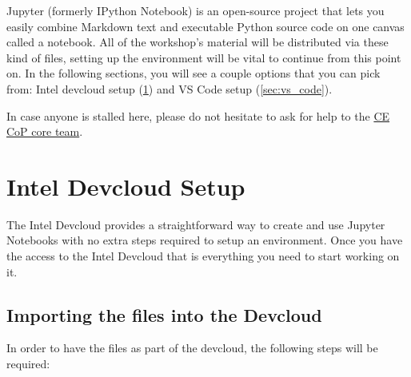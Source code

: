 \documentclass{assignment}
\begin{document}






Jupyter (formerly IPython Notebook) is an open-source project that lets you easily combine Markdown text and executable Python source code on one canvas called a notebook. All of the workshop's material will be distributed via these kind of files, setting up the environment will be vital to continue from this point on. In the following sections, you will see a couple options that you can pick from: Intel devcloud setup (\ref{sec:dev_cloud}) and VS Code setup (\ref{sec:vs_code}).

In case anyone is stalled here, please do not hesitate to ask for help to the \href{mailto:computer.eng.cop.core.team@intel.com}{CE CoP core team}. 

\section{Intel Devcloud Setup}
\label{sec:dev_cloud}

The Intel Devcloud provides a straightforward way to create and use Jupyter Notebooks with no extra steps required to setup an environment. Once you have the access to the Intel Devcloud that is everything you need to start working on it.

\subsection{Importing the files into the Devcloud}

In order to have the files as part of the devcloud, the following steps will be required:
\end{document}
